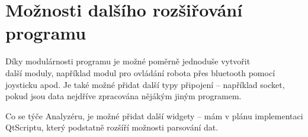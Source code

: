 \documentclass[12pt, a4paper, oneside]{article}
\begin{document}
\section*{Možnosti dalšího rozšiřování programu}
Díky modulárnosti programu je možné poměrně jednoduše vytvořit \\ 
další moduly, například modul pro ovládání robota přes bluetooth pomocí joysticku apod. Je také možné přidat další typy připojení -- například socket, pokud jsou data nejdříve zpracována nějákým jiným programem.

Co se týče Analyzéru, je možné přidat další widgety -- mám v plánu implementaci QtScriptu\cite{qtscript}, který podstatně rozšíří možnosti parsování dat.

\newpage
{}
\end{document}
